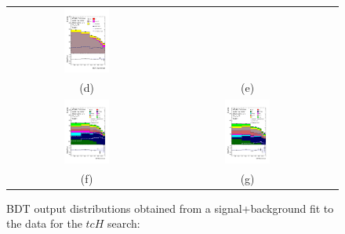 \begin{figure}[H]
\begin{tabular}{@{}ccc@{}}
\includegraphics[width=0.3\textwidth]{figures/tcH_reg1l1tau1b3j_os.pdf}&\\
(d) & (e)\\
\includegraphics[width=0.3\textwidth]{figures/tcH_reg2mtau1b2jos.pdf}&
\includegraphics[width=0.3\textwidth]{figures/tcH_reg2mtau1b3jos.pdf}&\\
(f) & (g)  &  \\
\end{tabular}
\caption{ BDT output distributions obtained from a signal+background fit to the data for the $tcH$ search: 
}
\end{figure}
